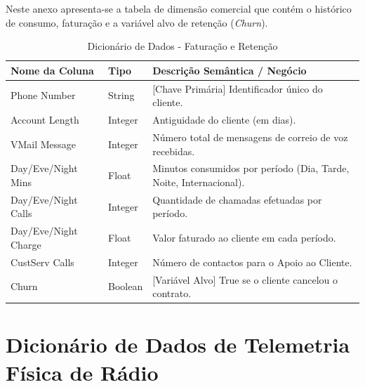 \documentclass[runningheads]{llncs}
\begin{document}
Neste anexo apresenta-se a tabela de dimensão comercial que contém o histórico de consumo, faturação e a variável alvo de retenção (\textit{Churn}).

\begin{table}[ht]
\centering
\caption{Dicionário de Dados - Faturação e Retenção}
\renewcommand{\arraystretch}{1.2}
\begin{tabularx}{\textwidth}{@{}l l X@{}}
\toprule
\textbf{Nome da Coluna} & \textbf{Tipo} & \textbf{Descrição Semântica / Negócio} \\
\midrule
Phone Number & String & [Chave Primária] Identificador único do cliente. \\
Account Length & Integer & Antiguidade do cliente (em dias). \\
VMail Message & Integer & Número total de mensagens de correio de voz recebidas. \\
Day/Eve/Night Mins & Float & Minutos consumidos por período (Dia, Tarde, Noite, Internacional). \\
Day/Eve/Night Calls & Integer & Quantidade de chamadas efetuadas por período. \\
Day/Eve/Night Charge & Float & Valor faturado ao cliente em cada período. \\
CustServ Calls & Integer & Número de contactos para o Apoio ao Cliente. \\
Churn & Boolean & [Variável Alvo] True se o cliente cancelou o contrato. \\
\bottomrule
\end{tabularx}
\end{table}

\clearpage

\section{Dicionário de Dados de Telemetria Física de Rádio}
\label{anexo:dic_telemetria}
\end{document}
